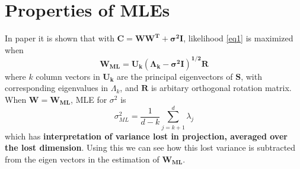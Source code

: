 \section{Properties of MLEs}
In paper \cite{PPCA} it is shown that with $\mathbf{C = WW^T + \sigma^2I}$, likelihood \ref{eq1} is maximized when 
\begin{equation}
\mathbf{W_{ML} = U_k(\Lambda_k - \sigma^2I)^{1/2}R}
\end{equation}
where $k$ column vectors in $\mathbf{U_k}$ are the principal eigenvectors of $\mathbf{S}$, with corresponding eigenvalues in $\Lambda_k$, and $\mathbf{R}$ is arbitary orthogonal rotation matrix. \\
When $\mathbf{W = W_{ML}}$, MLE for $\sigma^2$ is
\begin{equation}
\sigma^2_{ML} = \frac{1}{d - k}\sum_{j=k+1}^d\lambda_j
\end{equation}
which has \textbf{interpretation of variance lost in projection, averaged over the lost dimension}. Using this we can see how this lost variance is subtracted from the eigen vectors in the estimation of $\mathbf{W_{ML}}$.